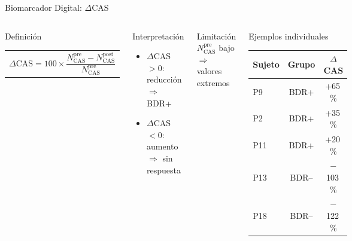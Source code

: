 ﻿\documentclass[aspectratio=169,10pt]{beamer}
\begin{document}
\begin{frame}{Biomarcador Digital: $\Delta$CAS}
  \begin{columns}
      \begin{block}{Definición}
        \begin{tabular}{c}
          $\displaystyle\Delta\text{CAS} = 100 \times \dfrac{N_{\text{CAS}}^{\text{pre}} - N_{\text{CAS}}^{\text{post}}}{N_{\text{CAS}}^{\text{pre}}}$
        \end{tabular}
      \end{block}
      \begin{block}{Interpretación}
        \begin{itemize}
          \item \textcolor{controls}{$\Delta$CAS $> 0$}: reducción $\Rightarrow$ BDR+
          \item \textcolor{bdrminus}{$\Delta$CAS $< 0$}: aumento $\Rightarrow$ sin respuesta
        \end{itemize}
      \end{block}
      \begin{alertblock}{Limitación}
        \small $N_\text{CAS}^\text{pre}$ bajo $\Rightarrow$ valores extremos
      \end{alertblock}
      \begin{block}{Ejemplos individuales}
        \centering\small
        \begin{tabular}{lcc}
          \toprule
          \textbf{Sujeto} & \textbf{Grupo} & \textbf{$\Delta$CAS} \\
          \midrule
          P9  & \textcolor{bdrplus}{BDR+}  & \textcolor{controls}{+65\,\%} \\
          P2  & \textcolor{bdrplus}{BDR+}  & \textcolor{controls}{+35\,\%} \\
          P11 & \textcolor{bdrplus}{BDR+}  & \textcolor{controls}{+20\,\%} \\
          \midrule
          P13 & \textcolor{bdrminus}{BDR--} & \textcolor{bdrminus}{$-$103\,\%} \\
          P18 & \textcolor{bdrminus}{BDR--} & \textcolor{bdrminus}{$-$122\,\%} \\
          \bottomrule
        \end{tabular}
      \end{block}
  \end{columns}
\end{frame}
\end{document}
